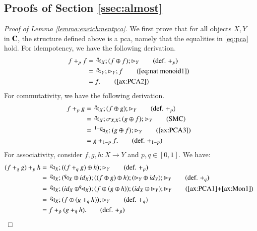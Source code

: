    
   
   \subsection{Proofs of Section \ref{ssec:almost}}
   
   \begin{proof}[Proof of Lemma \ref{lemma:enrichmentpca}]
We first prove that for all objects $X,Y$ in $\mathbf{C}$, the structure defined above is a pca, namely that the equalities in \eqref{eq:pca} hold.
   For idempotency, we have the following derivation. %
   \begin{align}
        f +_p f & =\, \diagp{X};(f \oplus f);\codiag{Y} \tag{def. $+_p$}\\
        & =\, \diagp{Y};\codiag{Y};f \tag{\ref{eq:nat monoid1}}\\
        & = f. \tag{\ref{ax:PCA2}}
   \end{align} 
For commutativity, we have the following derivation.
    \begin{align}
        f +_p g & =\, \diagp{X};(f \oplus g);\codiag{Y} \tag{def. $+_p$}\\
        & =\, \diagp{X};\sigma_{X,X};(g \oplus f);\codiag{Y} \tag{SMC}\\
        & =\, \diaggen{1-p}{X} ;(g \oplus f);\codiag{Y} \tag{\ref{ax:PCA3}}\\
        & = g +_{1-p} f. \tag{def. $+_{1-p}$}
    \end{align}
    For associativity, consider $f,g,h\colon X \to Y$ and $p,q\in[0,1]$. We have:
    \begin{align}
        (f +_q g) +_p h & =\, \diagp{X};((f +_q g) \oplus h);\codiag{Y} \tag{def. $+_p$}\\
        & =\, \diagp{X};(\diagq{X} \oplus \id{X});((f \oplus g) \oplus h);(\codiag{Y}\oplus \id{Y});\codiag{Y} \tag{def. $+_q$}\\
        & =\, \diagptilde{X};(\id{X} \oplus \diagqtilde{X});(f \oplus (g \oplus h));( \id{X}\oplus\codiag{Y} );\codiag{Y} \tag{\ref{ax:PCA1}+\ref{ax:Mon1}}\\
        & =\, \diagptilde{X};(f \oplus (g +_{\tilde{q}} h));\codiag{Y} \tag{def. $+_{\tilde{q}}$}\\
        & = f +_{\tilde{p}} (g +_{\tilde{q}} h). \tag{def. $+_{\tilde{p}}$}
    \end{align}




\end{proof}
